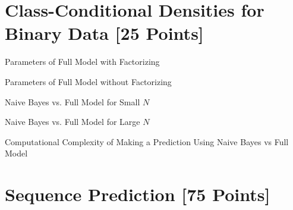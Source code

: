 \newif\ifshowsolutions
\showsolutionstrue







\pagestyle{fancy}


\section{Class-Conditional Densities for Binary Data [25 Points]}

\problem[5] Parameters of Full Model with Factorizing
\begin{subsolution}
	
\end{subsolution}
\clearpage

\problem[5] Parameters of Full Model without Factorizing
\begin{subsolution}
	
\end{subsolution}
\clearpage

\problem[2] Naive Bayes vs. Full Model for Small $N$
\begin{subsolution}
	
\end{subsolution}
\clearpage

\problem[2] Naive Bayes vs. Full Model for Large $N$
\begin{subsolution}
	
\end{subsolution}
\clearpage

\problem[11] Computational Complexity of Making a Prediction Using Naive Bayes vs Full Model
\begin{subsolution}
	
\end{subsolution}
\clearpage


\newpage
\section{Sequence Prediction [75 Points]}

